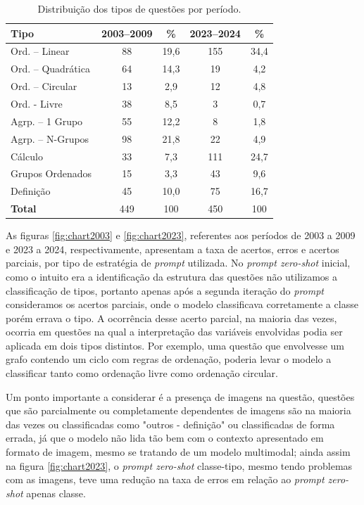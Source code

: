 \documentclass[12pt]{article}
\begin{document}
\begin{table}[H]
\centering
\caption{Distribuição dos tipos de questões por período.}
\label{tab:classes-tipos-periodos}
\begin{tabular}{|l|cc|cc|}
\hline
\textbf{Tipo} & \textbf{2003–2009} & \textbf{\%} & \textbf{2023–2024} & \textbf{\%} \\
\hline
Ord. – Linear       & 88    & 19,6  & 155   & 34,4  \\
Ord. – Quadrática   & 64    & 14,3  & 19    & 4,2   \\
Ord. – Circular     & 13    & 2,9   & 12    & 4,8   \\
Ord. - Livre        & 38    & 8,5   & 3     & 0,7   \\
Agrp. – 1 Grupo     & 55    & 12,2  & 8     & 1,8   \\
Agrp. – N-Grupos    & 98    & 21,8  & 22    & 4,9   \\
Cálculo             & 33    & 7,3   & 111   & 24,7  \\
Grupos Ordenados    & 15    & 3,3   & 43    & 9,6   \\
Definição           & 45    & 10,0  & 75    & 16,7  \\
\hline
\textbf{Total}      & 449   & 100   & 450   & 100   \\
\hline
\end{tabular}
\end{table}    

    As figuras \ref{fig:chart2003} e \ref{fig:chart2023}, referentes aos períodos de 2003 a 2009 e 2023 a 2024, respectivamente, apresentam a taxa de acertos, erros e acertos parciais, por tipo de estratégia de \textit{prompt} utilizada. No \textit{prompt zero-shot} inicial, como o intuito era a identificação da estrutura das questões não utilizamos a classificação de tipos, portanto apenas após a segunda iteração do \textit{prompt} consideramos os acertos parciais, onde o modelo classificava corretamente a classe porém errava o tipo. A ocorrência desse acerto parcial, na maioria das vezes, ocorria em questões na qual a interpretação das variáveis envolvidas podia ser aplicada em dois tipos distintos. Por exemplo, uma questão que envolvesse um grafo contendo um ciclo com regras de ordenação, poderia levar o modelo a classificar tanto como ordenação livre como ordenação circular.

    Um ponto importante a considerar é a presença de imagens na questão, questões que são parcialmente ou completamente dependentes de imagens são na maioria das vezes ou classificadas como "outros - definição" ou classificadas de forma errada, já que o modelo não lida tão bem com o contexto apresentado em formato de imagem, mesmo se tratando de um modelo multimodal; ainda assim na figura \ref{fig:chart2023}, o \textit{prompt zero-shot} classe-tipo, mesmo tendo problemas com as imagens, teve uma redução na taxa de erros em relação ao \textit{prompt zero-shot} apenas classe.
\end{document}
